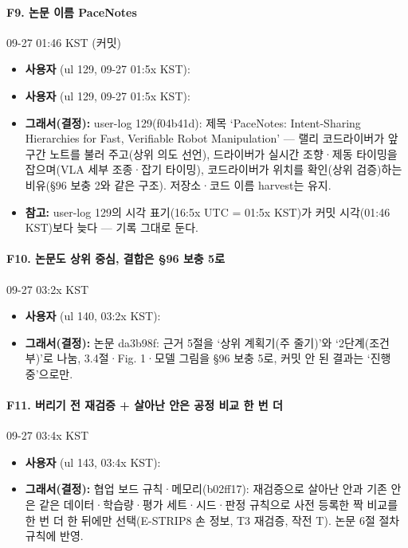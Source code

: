 \paragraph{F9. 논문 이름 PaceNotes}
{\small 09-27 01:46 KST (커밋)}
\begin{itemize}
  \item \textbf{사용자} (ul 129, 09-27 01:5x KST): 
  \item \textbf{사용자} (ul 129, 09-27 01:5x KST): 
  \item \textbf{그래서(결정):} user-log 129(f04b41d): 제목 `PaceNotes: Intent-Sharing Hierarchies for Fast, Verifiable Robot Manipulation' --- 랠리 코드라이버가 앞 구간 노트를 불러 주고(상위 의도 선언), 드라이버가 실시간 조향·제동 타이밍을 잡으며(VLA 세부 조종·잡기 타이밍), 코드라이버가 위치를 확인(상위 검증)하는 비유(§96 보충 2와 같은 구조). 저장소·코드 이름 harvest는 유지.
  \item \textbf{참고:} user-log 129의 시각 표기(16:5x UTC = 01:5x KST)가 커밋 시각(01:46 KST)보다 늦다 --- 기록 그대로 둔다.
\end{itemize}

\paragraph{F10. 논문도 상위 중심, 결합은 §96 보충 5로}
{\small 09-27 03:2x KST}
\begin{itemize}
  \item \textbf{사용자} (ul 140, 03:2x KST): 
  \item \textbf{그래서(결정):} 논문 da3b98f: 근거 5절을 `상위 계획기(주 줄기)'와 `2단계(조건부)'로 나눔, 3.4절·Fig. 1·모델 그림을 §96 보충 5로, 커밋 안 된 결과는 `진행 중'으로만.
\end{itemize}

\paragraph{F11. 버리기 전 재검증 + 살아난 안은 공정 비교 한 번 더}
{\small 09-27 03:4x KST}
\begin{itemize}
  \item \textbf{사용자} (ul 143, 03:4x KST): 
  \item \textbf{그래서(결정):} 협업 보드 규칙·메모리(b02ff17): 재검증으로 살아난 안과 기존 안은 같은 데이터·학습량·평가 세트·시드·판정 규칙으로 사전 등록한 짝 비교를 한 번 더 한 뒤에만 선택(E-STRIP8 손 정보, T3 재검증, 작전 T). 논문 6절 절차 규칙에 반영.
\end{itemize}
